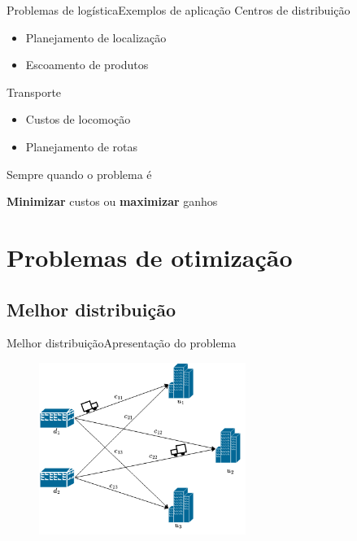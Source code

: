 \documentclass{beamer}
\newenvironment{outeritemize}{\begin{itemize}}{\end{itemize}\vspace{12pt}}
\begin{document}
\begin{frame}{Problemas de logística}{Exemplos de aplicação}
    Centros de distribuição
    \begin{outeritemize}
        \item Planejamento de localização
        \item Escoamento de produtos
    \end{outeritemize}
    Transporte
    \begin{outeritemize}
        \item Custos de locomoção
        \item Planejamento de rotas
    \end{outeritemize}
    \vspace{12pt}
    Sempre quando o problema é
    \begin{center}
        \textbf{Minimizar} custos ou \textbf{maximizar} ganhos
    \end{center}
\end{frame}

\section{Problemas de otimização}

\subsection{Melhor distribuição}

\begin{frame}{Melhor distribuição}{Apresentação do problema}
    \begin{figure}
    \centering
    \includegraphics[width=0.6\textwidth]{assets/MelhorLocalizacao/ExemploMelhorLocalizacao.drawio.png}
    \end{figure}
\end{frame}
\end{document}

